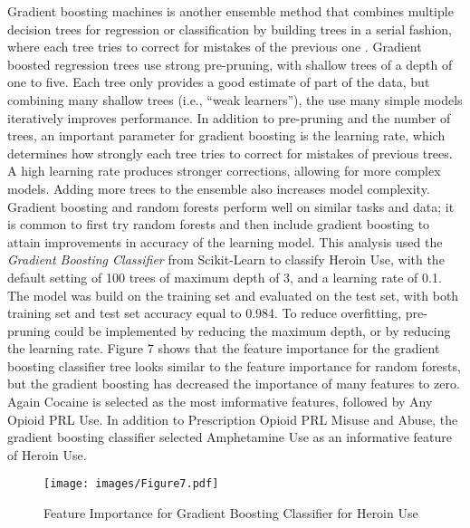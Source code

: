 \documentclass[sigconf]{acmart}
\begin{document}
Gradient boosting machines is another ensemble method that combines multiple
decision trees for regression or classification by building trees in a serial 
fashion, where each tree tries to correct for mistakes of the previous one
\cite{muller17}. Gradient boosted regression trees use strong pre-pruning, 
with shallow trees of a depth of one to five. Each tree only provides a good
estimate of part of the data, but combining many shallow trees (i.e., ``weak 
learners''), the use many simple models iteratively improves performance. In 
addition to pre-pruning and the number of trees, an important parameter for 
gradient boosting is the learning rate, which determines how strongly each
tree tries to correct for mistakes of previous trees. A high learning rate
produces stronger corrections, allowing for more complex models. Adding
more trees to the ensemble also increases model complexity. Gradient boosting
and random forests perform well on similar tasks and data; it is common to
first try random forests and then include gradient boosting to attain 
improvements in accuracy of the learning model. This analysis used the 
\emph{Gradient Boosting Classifier} from Scikit-Learn to classify Heroin Use, 
with the default setting of 100 trees of maximum depth of 3, and a learning 
rate of 0.1. The model was build on the training set and evaluated on the test 
set, with both training set and test set accuracy equal to 0.984. To reduce
overfitting, pre-pruning could be implemented by reducing the maximum depth, 
or by reducing the learning rate. Figure 7 shows that the feature importance 
for the gradient boosting classifier tree looks similar to the feature 
importance for random forests, but the gradient boosting has decreased the 
importance of many features to zero. Again Cocaine is selected as the most 
imformative features, followed by Any Opioid PRL Use. In addition to 
Prescription Opioid PRL Misuse and Abuse, the gradient boosting classifier 
selected Amphetamine Use as an informative feature of Heroin Use. 

\begin{figure}[!ht]
  \centering\texttt{[image: images/Figure7.pdf]}
  \caption{Feature Importance for Gradient Boosting Classifier for Heroin Use}
  \label{f:Figure7}
\end{figure}
\end{document}

